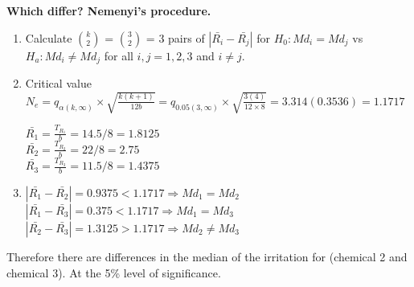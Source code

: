 \documentclass{article}
\begin{document}
\begin{enumerate}[1.]
\textbf{Which differ? Nemenyi's procedure.}

\begin{enumerate}[1)]
\item Calculate $k \choose 2$ = $3 \choose 2 $ = 3 pairs of $|\bar{R_i} - \bar{R_j}|$ for $H_0: Md_i = Md_j$ vs $H_a: Md_i \neq Md_j$ for all $i,j = 1,2,3$ and $i \neq j$. 

\item Critical value $N_e = q_{\alpha(k, \infty)}\times\sqrt{\frac{k(k+1)}{12b}} = q_{0.05(3, \infty)}\times\sqrt{\frac{3(4)}{12\times8}} = 3.314(0.3536) = 1.1717$

$\bar{R_1} = \frac{T_{R_1}}{b} = 14.5/8 = 1.8125$ \\
$\bar{R_2} = \frac{T_{R_2}}{b} = 22/8 = 2.75$ \\
$\bar{R_3} = \frac{T_{R_3}}{b} = 11.5/8 = 1.4375$ \\

\item
$|\bar{R_1} - \bar{R_2}| = 0.9375 < 1.1717 \Rightarrow Md_1 = Md_2$ \\
$|\bar{R_1} - \bar{R_3}| = 0.375 < 1.1717 \Rightarrow Md_1 = Md_3$ \\
$|\bar{R_2} - \bar{R_3}| = 1.3125 > 1.1717 \Rightarrow Md_2 \neq Md_3$ \\
\end{enumerate}

Therefore there are differences in the median of the irritation for (chemical 2 and chemical 3). At the 5\% level of significance.

\end{enumerate}
\end{document}
